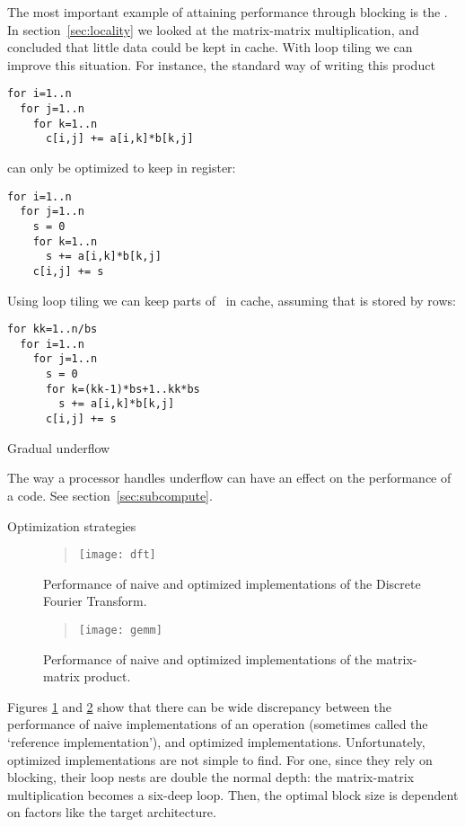 The most important example of attaining performance through blocking
is the .
In section~\ref{sec:locality} we looked at the matrix-matrix
multiplication, and concluded that little data could be kept in
cache. With loop tiling we can improve this situation. For instance,
the standard way of writing this product
\begin{verbatim}
for i=1..n
  for j=1..n
    for k=1..n
      c[i,j] += a[i,k]*b[k,j]
\end{verbatim}
can only be optimized to keep  in register:
\begin{verbatim}
for i=1..n
  for j=1..n
    s = 0
    for k=1..n
      s += a[i,k]*b[k,j]
    c[i,j] += s
\end{verbatim}
Using loop tiling we can keep parts of~ in cache,
assuming that  is stored by rows:
\begin{verbatim}
for kk=1..n/bs
  for i=1..n
    for j=1..n
      s = 0
      for k=(kk-1)*bs+1..kk*bs
        s += a[i,k]*b[k,j]
      c[i,j] += s
\end{verbatim}


 {Gradual underflow}

The way a processor handles underflow can have an effect on the performance
of a code. See section~\ref{sec:subcompute}.

 {Optimization strategies}
\label{sec:scalar-opt}

\begin{figure}[ht]
  \begin{quote}
  \texttt{[image: dft]}
  \end{quote}
  \caption{Performance of naive and optimized implementations of the Discrete Fourier Transform.}
  \label{fig:dft-perf}
\end{figure}

\begin{figure}[ht]
  \begin{quote}
  \texttt{[image: gemm]}
  \end{quote}
  \caption{Performance of naive and optimized implementations of the matrix-matrix product.}
  \label{fig:gemm-perf}
\end{figure}

Figures \ref{fig:dft-perf} and \ref{fig:gemm-perf} show that there can
be wide discrepancy between the performance of naive implementations
of an operation (sometimes called the `reference implementation'), and
optimized implementations. Unfortunately, optimized implementations
are not simple to find. For one, since they rely on blocking, their
loop nests are double the normal depth: the matrix-matrix
multiplication becomes a six-deep loop. Then, the optimal block size
is dependent on factors like the target architecture.

